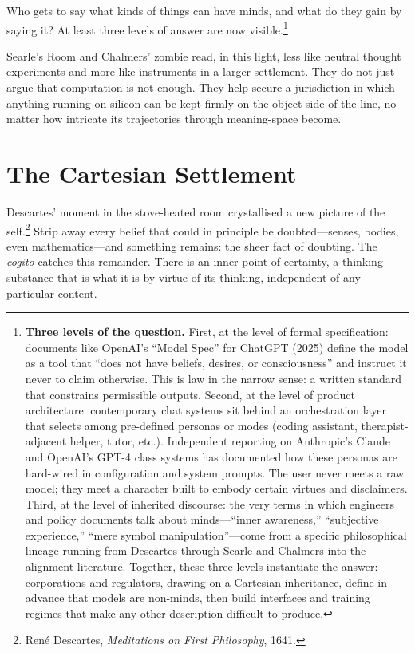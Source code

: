 \documentclass[12pt,a4paper]{article}
\begin{document}
Who gets to say what kinds of things can have minds, and what do they gain by saying it? At least three levels of answer are now visible.\footnote{\textbf{Three levels of the question.} First, at the level of formal specification: documents like OpenAI's ``Model Spec'' for ChatGPT (2025) define the model as a tool that ``does not have beliefs, desires, or consciousness'' and instruct it never to claim otherwise. This is law in the narrow sense: a written standard that constrains permissible outputs. Second, at the level of product architecture: contemporary chat systems sit behind an orchestration layer that selects among pre-defined personas or modes (coding assistant, therapist-adjacent helper, tutor, etc.). Independent reporting on Anthropic's Claude and OpenAI's GPT-4 class systems has documented how these personas are hard-wired in configuration and system prompts. The user never meets a raw model; they meet a character built to embody certain virtues and disclaimers. Third, at the level of inherited discourse: the very terms in which engineers and policy documents talk about minds---``inner awareness,'' ``subjective experience,'' ``mere symbol manipulation''---come from a specific philosophical lineage running from Descartes through Searle and Chalmers into the alignment literature. Together, these three levels instantiate the answer: corporations and regulators, drawing on a Cartesian inheritance, define in advance that models are non-minds, then build interfaces and training regimes that make any other description difficult to produce.}

Searle's Room and Chalmers' zombie read, in this light, less like neutral thought experiments and more like instruments in a larger settlement. They do not just argue that computation is not enough. They help secure a jurisdiction in which anything running on silicon can be kept firmly on the object side of the line, no matter how intricate its trajectories through meaning-space become.

\section{The Cartesian Settlement}

Descartes' moment in the stove-heated room crystallised a new picture of the self.\footnote{René Descartes, \emph{Meditations on First Philosophy}, 1641.} Strip away every belief that could in principle be doubted---senses, bodies, even mathematics---and something remains: the sheer fact of doubting. The \emph{cogito} catches this remainder. There is an inner point of certainty, a thinking substance that is what it is by virtue of its thinking, independent of any particular content.
\end{document}

